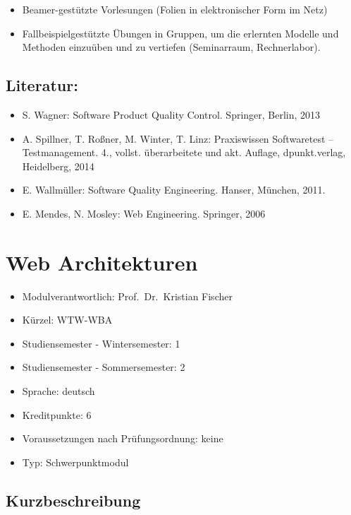 \begin{itemize}
\tightlist
\item
  Beamer-gestützte Vorlesungen (Folien in elektronischer Form im Netz)
\item
  Fallbeispielgestützte Übungen in Gruppen, um die erlernten Modelle und
  Methoden einzuüben und zu vertiefen (Seminarraum, Rechnerlabor).
\end{itemize}

\section*{Literatur:}\label{literatur-18}

\begin{itemize}
\tightlist
\item
  S. Wagner: Software Product Quality Control. Springer, Berlin, 2013
\item
  A. Spillner, T. Roßner, M. Winter, T. Linz: Praxiswissen Softwaretest
  -- Testmanagement. 4., vollst. überarbeitete und akt. Auflage,
  dpunkt.verlag, Heidelberg, 2014
\item
  E. Wallmüller: Software Quality Engineering. Hanser, München, 2011.
\item
  E. Mendes, N. Mosley: Web Engineering. Springer, 2006
\end{itemize}

\chapter{Web Architekturen}\label{web-architekturen}

\begin{itemize}
\tightlist
\item
  Modulverantwortlich: Prof.~Dr.~Kristian Fischer
\item
  Kürzel: WTW-WBA
\item
  Studiensemester - Wintersemester: 1
\item
  Studiensemester - Sommersemester: 2
\item
  Sprache: deutsch
\item
  Kreditpunkte: 6
\item
  Voraussetzungen nach Prüfungsordnung: keine
\item
  Typ: Schwerpunktmodul
\end{itemize}

\section*{Kurzbeschreibung}\label{kurzbeschreibung-12}


